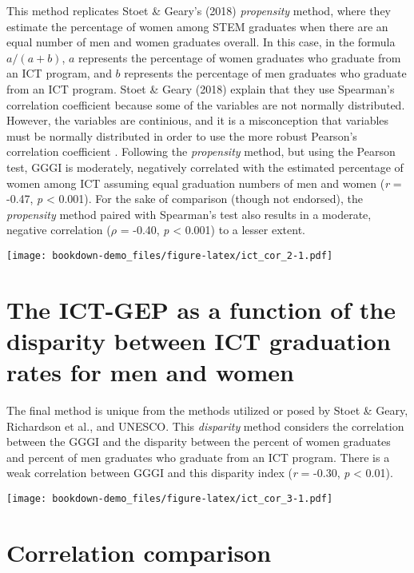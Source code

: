 \documentclass[]{book}
\begin{document}
This method replicates Stoet \& Geary's (2018) \emph{propensity} method,
where they estimate the percentage of women among STEM graduates when
there are an equal number of men and women graduates overall. In this
case, in the formula \(a/(a + b)\), \(a\) represents the percentage of
women graduates who graduate from an ICT program, and \(b\) represents
the percentage of men graduates who graduate from an ICT program. Stoet
\& Geary (2018) explain that they use Spearman's correlation coefficient
because some of the variables are not normally distributed. However, the
variables are continious, and it is a misconception that variables must
be normally distributed in order to use the more robust Pearson's
correlation coefficient \citep{nefzgerNeedlessAssumptionNormality1957}.
Following the \emph{propensity} method, but using the Pearson test, GGGI
is moderately, negatively correlated with the estimated percentage of
women among ICT assuming equal graduation numbers of men and women
(\emph{r} = -0.47, \emph{p} \textless{} 0.001). For the sake of
comparison (though not endorsed), the \emph{propensity} method paired
with Spearman's test also results in a moderate, negative correlation
(\(\rho\) = -0.40, \emph{p} \textless{} 0.001) to a lesser extent.

\texttt{[image: bookdown-demo\_files/figure-latex/ict\_cor\_2-1.pdf]}

\section{The ICT-GEP as a function of the disparity between ICT
graduation rates for men and
women}\label{the-ict-gep-as-a-function-of-the-disparity-between-ict-graduation-rates-for-men-and-women}

The final method is unique from the methods utilized or posed by Stoet
\& Geary, Richardson et al., and UNESCO. This \emph{disparity} method
considers the correlation between the GGGI and the disparity between the
percent of women graduates and percent of men graduates who graduate
from an ICT program. There is a weak correlation between GGGI and this
disparity index (\emph{r} = -0.30, \emph{p} \textless{} 0.01).

\texttt{[image: bookdown-demo\_files/figure-latex/ict\_cor\_3-1.pdf]}

\section{Correlation comparison}\label{correlation-comparison}
\end{document}
